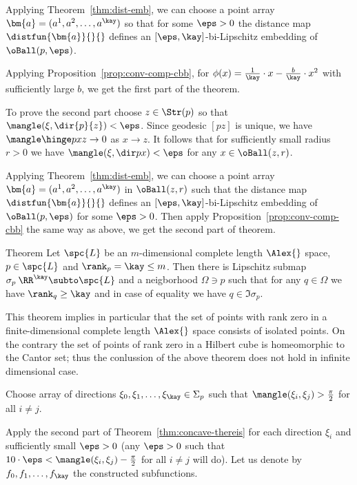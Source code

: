 Applying Theorem~\ref{thm:dist-emb},
we can choose a point array $\bm{a}=(a^1,a^2,\dots,a^\kay)$ so that for some $\eps>0$
the distance map $\distfun{\bm{a}}{}{}$ defines an $[\eps,\kay]$-bi-Lipschitz embedding 
of $\oBall(p,\eps)$.

Applying Proposition~\ref{prop:conv-comp-cbb},
for $\phi(x)={\tfrac1\kay}\cdot x-\tfrac{b}{\kay}\cdot x^2$ 
with sufficiently large $b$, we get the first part of the theorem.

To prove the second part choose $z\in\Str(p)$ so that $\mangle(\xi, \dir{p}{z})<\eps$.
Since geodesic $[pz]$ is unique,
we have $\mangle\hinge pxz\to 0$ as $x\to z$.
It follows that for sufficiently small radius $r>0$
we have 
$\mangle(\xi,\dir px)<\eps$
for any $x\in\oBall(z,r)$.

Applying Theorem~\ref{thm:dist-emb}, we can choose a point array $\bm{a}=(a^1,a^2,\dots,a^\kay)$ in $\oBall(z,r)$ such that the distance map $\distfun{\bm{a}}{}{}$ defines an $[\eps,\kay]$-bi-Lipschitz embedding 
of $\oBall(p,\eps)$ for some $\eps>0$.
Then apply Proposition~\ref{prop:conv-comp-cbb} the same way as above, we get the second part of theorem.
\qeds


\begin{thm}{Theorem}\label{thm:rank=kay}
Let $\spc{L}$ be an $m$-dimensional complete length $\Alex{}$ space,
$p\in\spc{L}$ and $\rank_p=\kay\le m$.
Then there is Lipschitz submap $\sigma_p\:\RR^\kay\subto\spc{L}$
and a neigborhood $\Omega\ni p$
such that for any $q\in\Omega$ we have 
$\rank_q\ge \kay$  
and in case of equality we have $q\in\Im \sigma_p$.
\end{thm}

This theorem implies in particular that the set of points with rank zero in a finite-dimensional complete length $\Alex{}$ space consists of isolated points. 
On the contrary the set of points of rank zero in a Hilbert cube %
is homeomorphic to the Cantor set;
thus the conlussion of the above theorem does not hold in infinite dimensional case.

Choose array of directions $\xi_0,\xi_1,\dots,\xi_\kay\in\Sigma_p$ 
such that $\mangle(\xi_i,\xi_j)>\tfrac\pi2$ for all $i\not=j$.

Apply the second part of Theorem~\ref{thm:concave-thereis} for each direction $\xi_i$ and sufficiently small $\eps>0$
(any $\eps>0$ such that $10\cdot\eps< \mangle(\xi_i,\xi_j)-\tfrac\pi2$ for all $i\not=j$ will do).
Let us denote by $f_0,f_1,\dots, f_\kay$ the constructed subfunctions.

